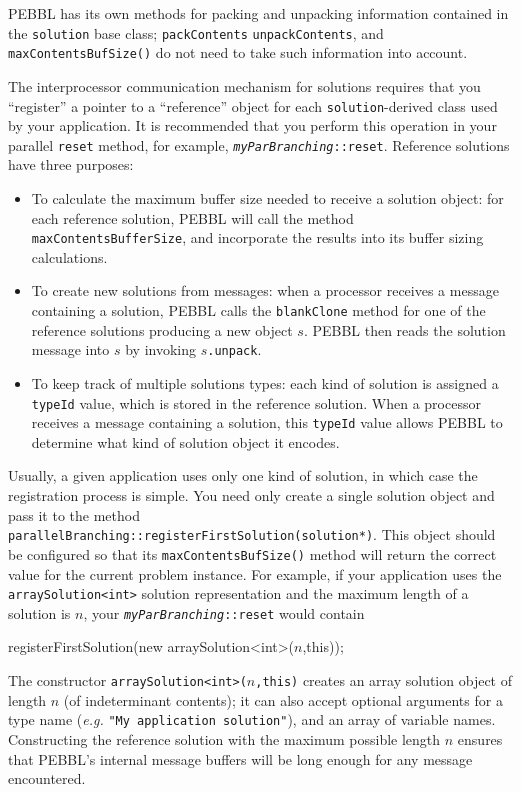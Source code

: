 \vspace{2ex}

PEBBL has its own methods for packing and unpacking information
contained in the \texttt{solution} base class; \texttt{packContents}
\texttt{unpackContents}, and \texttt{maxContentsBufSize()} do not need
to take such information into account.

The interprocessor communication mechanism for solutions requires that
you ``register'' a pointer to a ``reference'' object for each
\texttt{solution}-derived class used by your application.  It is
recommended that you perform this operation in your parallel
\texttt{reset} method, for example,
\texttt{\emph{myParBranching}::reset}.  Reference solutions have three
purposes:
\begin{itemize}
\item To calculate the maximum buffer size needed to receive a
  solution object: for each reference solution, PEBBL will call the
  method \texttt{maxContentsBufferSize}, and incorporate the results
  into its buffer sizing calculations.
\item To create new solutions from messages: when a processor receives
  a message containing a solution, PEBBL calls the \texttt{blankClone}
  method for one of the reference solutions producing a new object
  $s$.  PEBBL then reads the solution message into $s$ by invoking
  $s$\texttt{.unpack}.
\item To keep track of multiple solutions types: each kind of solution
  is assigned a \texttt{typeId} value, which is stored in the
  reference solution.  When a processor receives a message containing a
  solution, this \texttt{typeId} value allows PEBBL to determine what
  kind of solution object it encodes.
\end{itemize}
Usually, a given application uses only one kind of solution, in which
case the registration process is simple.  You need only create a
single solution object and pass it to the method
\texttt{parallelBranching::registerFirstSolution(solution*)}.  This
object should be configured so that its \texttt{maxContentsBufSize()}
method will return the correct value for the current problem instance.
For example, if your application uses the \texttt{arraySolution<int>}
solution representation and the maximum length of a solution is $n$,
your \texttt{\emph{myParBranching}::reset} would contain
\begin{codeblock}
registerFirstSolution(new arraySolution<int>($n$,this));
\end{codeblock}
The constructor \texttt{arraySolution<int>($n$,this)} creates an array
solution object of length $n$ (of indeterminant contents); it can also
accept optional arguments for a type name (\emph{e.g.} \texttt{"My
  application solution"}), and an array of variable names.
Constructing the reference solution with the maximum possible length
$n$ ensures that PEBBL's internal message buffers will be long
enough for any message encountered.  

